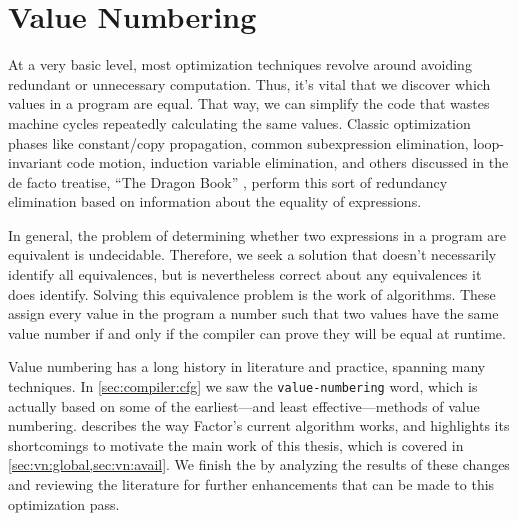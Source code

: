 \chapter{Value Numbering}\label{sec:vn}

At a very basic level, most optimization techniques revolve around avoiding
redundant or unnecessary computation.  Thus, it's vital that we discover which
values in a program are equal.  That way, we can simplify the code that wastes
machine cycles repeatedly calculating the same values.  Classic optimization
phases like constant/copy propagation, common subexpression elimination,
loop-invariant code motion, induction variable elimination, and others
discussed in the de facto treatise, ``The Dragon Book'' \autocite{DragonBook},
perform this sort of redundancy elimination based on information about the
equality of expressions.

In general, the problem of determining whether two expressions in a program are
equivalent is undecidable.  Therefore, we seek a  solution
that doesn't necessarily identify all equivalences, but is nevertheless correct
about any equivalences it does identify.  Solving this equivalence problem is
the work of  algorithms.  These assign every value in the
program a number such that two values have the same value number if and only if
the compiler can prove they will be equal at runtime.

Value numbering has a long history in literature and practice, spanning many
techniques.  In \cref{sec:compiler:cfg} we saw the \Verb|value-numbering|
word, which is actually based on some of the earliest---and least
effective---methods of value numbering.   describes the way
Factor's current algorithm works, and highlights its shortcomings to motivate
the main work of this thesis, which is covered in
\cref{sec:vn:global,sec:vn:avail}.  We finish the  by
analyzing the results of these changes and reviewing the literature for further
enhancements that can be made to this optimization pass.






